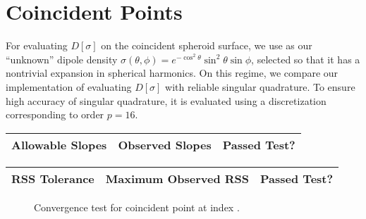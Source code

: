 \documentclass[12pt]{article}
\begin{document}
\section*{Coincident Points}
For evaluating $D[\sigma]$ on the coincident spheroid surface, we use as our ``unknown'' dipole density $\sigma(\theta,\phi)=e^{-\cos^2\theta} \sin^2\theta \sin\phi$, selected so that it has a nontrivial expansion in spherical harmonics. 
On this regime, we compare our implementation of evaluating $D[\sigma]$ with reliable singular quadrature.
To ensure high accuracy of singular quadrature, it is evaluated using a discretization corresponding to order $p=16$.

\begin{center}
\def\arraystretch{1.5}
\begin{tabular}{|c|c|c|}
    \hline
    Allowable Slopes & Observed Slopes & Passed Test?\\
    \hline
    
    \hline
\end{tabular}
\end{center}

\begin{center}
\def\arraystretch{1.5}
\begin{tabular}{|c|c|c|}
    \hline
    RSS Tolerance & Maximum Observed RSS & Passed Test?\\
    \hline
    
    \hline
\end{tabular}
\end{center}

\begin{figure}[!ht]
    \centering
    \caption{Convergence test for coincident point at index \protect.}
\end{figure}

\pagebreak
\end{document}
